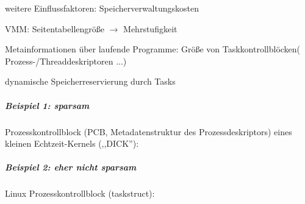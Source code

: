 \documentclass[a4paper]{article}
\begin{document}
\begin{multicols}{3}
    weitere Einflussfaktoren: Speicherverwaltungskosten

    \begin{itemize*}
        \item
        VMM: Seitentabellengröße $\rightarrow$ Mehrstufigkeit
        \item
        Metainformationen über laufende Programme: Größe von
        Taskkontrollblöcken( Prozess-/Threaddeskriptoren ...)
        \item
        dynamische Speicherreservierung durch Tasks
    \end{itemize*}


    \subparagraph{Beispiel 1: sparsam}

    Prozesskontrollblock (PCB, Metadatenstruktur des Prozessdeskriptors)
    eines kleinen Echtzeit-Kernels (,,DICK''):



    \subparagraph{Beispiel 2: eher nicht sparsam}

    Linux Prozesskontrollblock (taskstruct):


\end{multicols}
\end{document}
